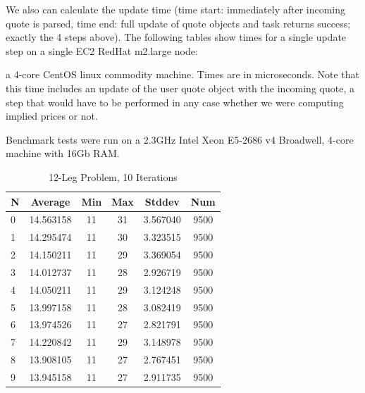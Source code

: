\documentclass{article}
\begin{document}
We also can calculate the update time (time start: immediately after incoming quote is parsed, time end: full update of quote objects and task returns success; exactly the 4 steps above).  The following tables show times for a single update step on a single EC2 RedHat m2.large node:



a 4-core CentOS linux commodity machine. Times are in microseconds. Note that this time includes an update of the user quote object with the incoming quote, a step that would have to be performed in any case whether we were computing implied prices or not.

Benchmark tests were run on a 2.3GHz Intel Xeon E5-2686 v4 Broadwell, 4-core machine with 16Gb RAM.
 
\clearpage
\begin{table}
\centering
\begin{tabular}{|l|c|c|c|c|c|}
\hline
N & Average & Min & Max & Stddev & Num \\
\hline
0 & 14.563158 & 11 & 31 & 3.567040 & 9500 \\ 
1 & 14.295474 & 11 & 30 & 3.323515 & 9500 \\ 
2 & 14.150211 & 11 & 29 & 3.369054 & 9500 \\ 
3 & 14.012737 & 11 & 28 & 2.926719 & 9500 \\ 
4 & 14.050211 & 11 & 29 & 3.124248 & 9500 \\ 
5 & 13.997158 & 11 & 28 & 3.082419 & 9500 \\ 
6 & 13.974526 & 11 & 27 & 2.821791 & 9500 \\ 
7 & 14.220842 & 11 & 29 & 3.148978 & 9500 \\ 
8 & 13.908105 & 11 & 27 & 2.767451 & 9500 \\ 
9 & 13.945158 & 11 & 27 & 2.911735 & 9500 \\ 
\hline
\end{tabular}
\caption{12-Leg Problem, 10 Iterations}
\label{tab:template}
\end{table}
\end{document}
